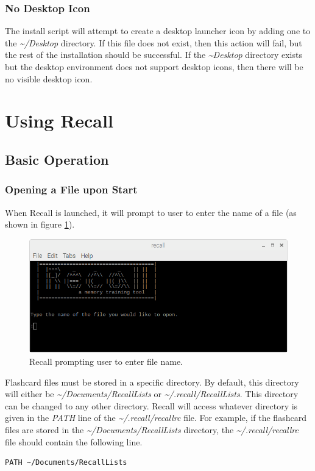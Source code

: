 \documentclass[letterpaper]{article}
\begin{document}
\subsubsection{No Desktop Icon}
The install script will attempt to create a desktop launcher icon by adding one to the \textit{\~{}/Desktop} directory. If this file does not exist, then this action will fail, but the rest of the installation should be successful. If the \textit{\~{}Desktop} directory exists but the desktop environment does not support desktop icons, then there will be no visible desktop icon.

\section{Using Recall}
\subsection{Basic Operation}
\subsubsection{Opening a File upon Start} \label{opening a file}
When Recall is launched, it will prompt to user to enter the name of a file (as shown in figure \ref{fig:enter_file_name}).

\begin{figure}[H]
  \centering
  \includegraphics[width=14cm]{images/running/enter_file.png}
  \caption{Recall prompting user to enter file name.}
  \label{fig:enter_file_name}
\end{figure}

Flashcard files must be stored in a specific directory. By default, this directory will either be \textit{\~{}/Documents/RecallLists} or \textit{\~{}/.recall/RecallLists}. This directory can be changed to any other directory. Recall will access whatever directory is given in the \textit{PATH} line of the \textit{\~{}/.recall/recallrc} file. For example, if the flashcard files are stored in the \textit{\~{}/Documents/RecallLists} directory, the \textit{\~{}/.recall/recallrc} file should contain the following line.
\begin{verbatim}
PATH ~/Documents/RecallLists
\end{verbatim}
\end{document}
